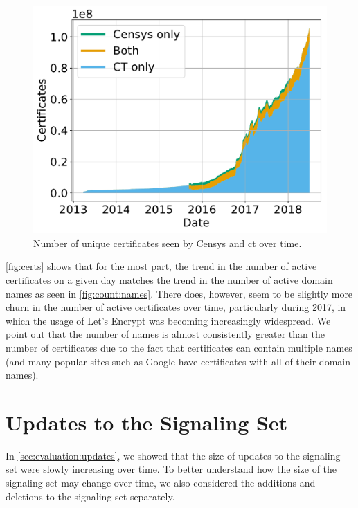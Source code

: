 \begin{figure}
  \centering
  \includegraphics[width=0.8\linewidth]{fig/cert_count_valid}
  \caption{Number of unique certificates seen by Censys and \ac{ct} over time.}
  \label{fig:certs}
\end{figure}

\autoref{fig:certs} shows that for the most part, the trend in the number of
active certificates on a given day matches the trend in the number of active
domain names as seen in \autoref{fig:count:names}. There does, however, seem to
be slightly more churn in the number of active certificates over time,
particularly during 2017, in which the usage of Let's Encrypt was becoming
increasingly widespread. We point out that the number of names is almost
consistently greater than the number of certificates due to the fact that
certificates can contain multiple names (and many popular sites such as Google
have certificates with all of their domain names).

\section{Updates to the Signaling Set}
\label{sec:updates}

In \autoref{sec:evaluation:updates}, we showed that the size of updates to the
signaling set were slowly increasing over time. To better understand how the
size of the signaling set may change over time, we also considered the additions
and deletions to the signaling set separately.

